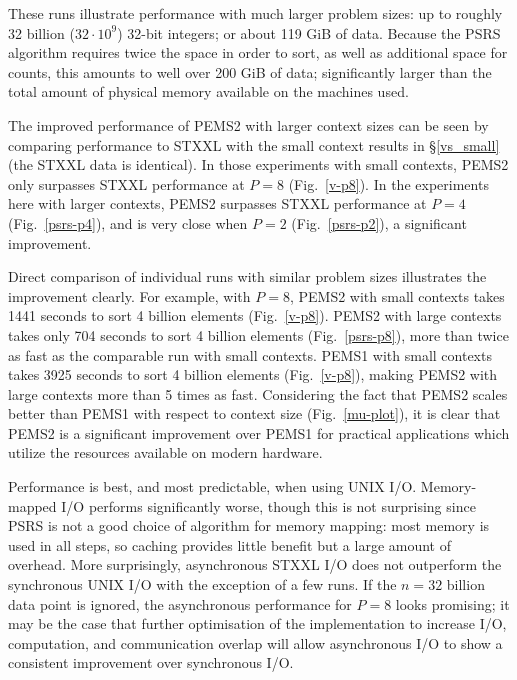 \documentclass[12pt]{carletoncsthesis}
\begin{document}
These runs illustrate performance with much larger problem sizes: up to
roughly 32 billion ($32\cdot10^9$) 32-bit integers; or about 119 GiB of data.
Because the PSRS algorithm requires twice the space in order to sort, as well
as additional space for counts, this amounts to well over 200 GiB of data;
significantly larger than the total amount of physical memory available on
the machines used.

The improved performance of PEMS2 with larger context sizes can be seen
by comparing performance to STXXL with the small context results in
\S\ref{vs_small} (the STXXL data is identical).  In those experiments
with small contexts, PEMS2 only surpasses STXXL performance at $P=8$
(Fig.~\ref{v-p8}).  In the experiments here with larger contexts, PEMS2
surpasses STXXL performance at $P=4$ (Fig.~\ref{psrs-p4}), and is very close
when $P=2$ (Fig.~\ref{psrs-p2}), a significant improvement.

Direct comparison of individual runs with similar problem sizes illustrates
the improvement clearly.  For example, with $P=8$, PEMS2 with small
contexts takes 1441 seconds to sort 4 billion elements (Fig.~\ref{v-p8}).
PEMS2 with large contexts takes only 704 seconds to sort 4 billion elements
(Fig.~\ref{psrs-p8}), more than twice as fast as the comparable run with
small contexts.  PEMS1 with small contexts takes 3925 seconds to sort 4
billion elements (Fig.~\ref{v-p8}), making PEMS2 with large contexts more
than 5 times as fast.  Considering the fact that PEMS2 scales better than
PEMS1 with respect to context size (Fig.~\ref{mu-plot}), it is clear that
PEMS2 is a significant improvement over PEMS1 for practical applications
which utilize the resources available on modern hardware.

Performance is best, and most predictable, when using UNIX I/O.  Memory-mapped
I/O performs significantly worse, though this is not surprising since PSRS
is not a good choice of algorithm for memory mapping: most memory is used in
all steps, so caching provides little benefit but a large amount of overhead.
More surprisingly, asynchronous STXXL I/O does not outperform the synchronous
UNIX I/O with the exception of a few runs.  If the $n=32$ billion data point
is ignored, the asynchronous performance for $P=8$ looks promising; it may
be the case that further optimisation of the implementation to increase I/O,
computation, and communication overlap will allow asynchronous I/O to show
a consistent improvement over synchronous I/O.
\end{document}
